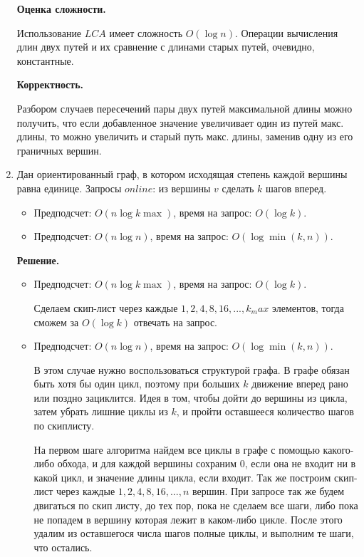 \begin{enumerate}
	\textbf{Оценка сложности.} 
	
	Использование $LCA$ имеет сложность $O(\log n)$. Операции вычисления длин двух путей и их 
	сравнение с длинами старых путей, очевидно, константные.
	
	\textbf{Корректность.} 
	
	Разбором случаев пересечений пары двух путей максимальной длины можно получить, что если
	добавленное значение увеличивает один из путей макс. длины, то можно увеличить и старый путь макс.
	длины, заменив одну из его граничных вершин. 
	
	\item Дан ориентированный граф, в котором исходящая степень каждой вершины равна единице.
	Запросы $online$: из вершины $v$ сделать $k$ шагов вперед.
	\begin{itemize}
		\item Предподсчет: $O(n \log k\max)$, время на запрос: $O(\log k)$.
		\item Предподсчет: $O(n \log n)$, время на запрос: $O(\log \min(k, n))$.
	\end{itemize}
	
	\textbf{Решение.}
	
	\begin{itemize}
		\item Предподсчет: $O(n \log k\max)$, время на запрос: $O(\log k)$.
		
		Сделаем скип-лист через каждые $1, 2, 4, 8, 16, ..., k_max$ элементов, тогда сможем за $O(\log k)$ отвечать на запрос.
		\item Предподсчет: $O(n \log n)$, время на запрос: $O(\log \min(k, n))$.
		
		В этом случае нужно воспользоваться структурой графа. В графе обязан быть хотя бы один 
		цикл, поэтому при больших $k$ движение вперед рано или поздно зациклится. Идея в том, 
		чтобы дойти до вершины из цикла, затем убрать лишние циклы из $k$, и пройти оставшееся 
		количество шагов по скиплисту.
		
		На первом шаге алгоритма найдем все циклы в графе с помощью какого-либо обхода, и для 
		каждой вершины сохраним 0, если она не входит ни в какой цикл, и значение длины цикла, 
		если входит. Так же построим скип-лист через каждые $1, 2, 4, 8, 16, ..., n$ вершин. 
		При запросе так же будем двигаться по скип листу, до тех пор, пока не сделаем все шаги, 
		либо пока не попадем в вершину которая лежит в каком-либо цикле. После этого удалим из 
		оставшегося числа шагов полные циклы, и выполним те шаги, что остались. 
		

\end{itemize}
\end{enumerate}
